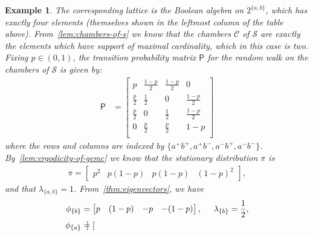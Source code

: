 \documentclass[11pt,a4paper]{article}
\newtheorem{example}[theorem]{Example}
\begin{document}
\begin{example}
    The corresponding lattice is the Boolean algebra on $2^{\{a, b\}}$,	which has exactly four elements (themselves shown in the leftmost column of the table above). From~\cref{lem:chambers-of-s} we know that the chambers ${\mathcal{C}}$ of $\mathcal{S}$ are exactly the elements which have support of maximal cardinality, which in this case is two. Fixing $p\in(0, 1)$, the transition probability matrix $\mathsf{P}$ for the random walk on the chambers of $\mathcal{S}$ is given by:
        \begin{align*}
            \mathsf{P} &= \begin{bmatrix}
                p & \frac{1-p}{2} & \frac{1-p}{2} & 0\\
                \frac{p}{2} & \frac{1}{2} & 0 & \frac{1-p}{2} \\
                \frac{p}{2}& 0 & \frac{1}{2} & \frac{1-p}{2} \\
                0 &\frac{p}{2} & \frac{p}{2}&1-p \\
            \end{bmatrix}
        \end{align*}
    where the rows and columns are indexed by $\{{a^+}{b^+},{a^+}{b^-}, {a^-}{b^+}, {a^-}{b^-}\}$. By~\cref{lem:ergodicity-of-gemc} we know that the stationary distribution $\pi$ is
        \begin{align*}
            \pi = \begin{bmatrix}
                p^2 & p(1-p) & p(1-p) & (1-p)^2
            \end{bmatrix},
        \end{align*}
    and that $\lambda_{\{a, b\}} = 1$. From~\cref{thm:eigenvectors}, we have
        \begin{align*}
            \phi_{\{b\}} &= \begin{bmatrix}
                p & (1-p) & -p & -(1-p)
            \end{bmatrix},\hspace{.5cm}\lambda_{\{b\}} = \frac{1}{2},\\
            \phi_{\{a\}} &= \begin{bmatrix}

\end{bmatrix}
\end{align*}
\end{example}
\end{document}
